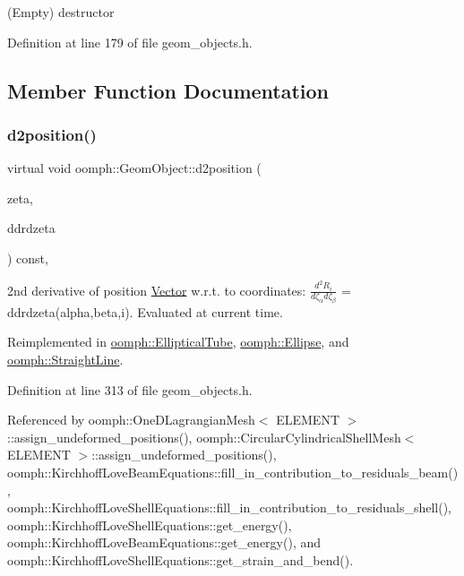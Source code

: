 (Empty) destructor 



Definition at line 179 of file geom\+\_\+objects.\+h.



\subsection{Member Function Documentation}
\mbox{\label{classoomph_1_1GeomObject_a08472dbe196123490ea109762cefd00c}} 
\subsubsection{\texorpdfstring{d2position()}{d2position()}\hspace{0.1cm}{\footnotesize\ttfamily [1/2]}}
{\footnotesize\ttfamily virtual void oomph\+::\+Geom\+Object\+::d2position (\begin{DoxyParamCaption}\item[{const \hyperlink{classoomph_1_1Vector}{Vector}$<$ double $>$ \&}]{zeta,  }\item[{\hyperlink{classoomph_1_1RankThreeTensor}{Rank\+Three\+Tensor}$<$ double $>$ \&}]{ddrdzeta }\end{DoxyParamCaption}) const\hspace{0.3cm}{\ttfamily [inline]}, {\ttfamily [virtual]}}



2nd derivative of position \hyperlink{classoomph_1_1Vector}{Vector} w.\+r.\+t. to coordinates\+: $ \frac{d^2R_i}{d \zeta_\alpha d \zeta_\beta}$ = ddrdzeta(alpha,beta,i). Evaluated at current time. 



Reimplemented in \hyperlink{classoomph_1_1EllipticalTube_a8b64fd523511735679b5820c5fb687cf}{oomph\+::\+Elliptical\+Tube}, \hyperlink{classoomph_1_1Ellipse_a19b6cecd9fcbcad1830a8a3c1e133672}{oomph\+::\+Ellipse}, and \hyperlink{classoomph_1_1StraightLine_ad4a437deb740dcc4c55b69e52e98d2d5}{oomph\+::\+Straight\+Line}.



Definition at line 313 of file geom\+\_\+objects.\+h.



Referenced by oomph\+::\+One\+D\+Lagrangian\+Mesh$<$ E\+L\+E\+M\+E\+N\+T $>$\+::assign\+\_\+undeformed\+\_\+positions(), oomph\+::\+Circular\+Cylindrical\+Shell\+Mesh$<$ E\+L\+E\+M\+E\+N\+T $>$\+::assign\+\_\+undeformed\+\_\+positions(), oomph\+::\+Kirchhoff\+Love\+Beam\+Equations\+::fill\+\_\+in\+\_\+contribution\+\_\+to\+\_\+residuals\+\_\+beam(), oomph\+::\+Kirchhoff\+Love\+Shell\+Equations\+::fill\+\_\+in\+\_\+contribution\+\_\+to\+\_\+residuals\+\_\+shell(), oomph\+::\+Kirchhoff\+Love\+Shell\+Equations\+::get\+\_\+energy(), oomph\+::\+Kirchhoff\+Love\+Beam\+Equations\+::get\+\_\+energy(), and oomph\+::\+Kirchhoff\+Love\+Shell\+Equations\+::get\+\_\+strain\+\_\+and\+\_\+bend().

